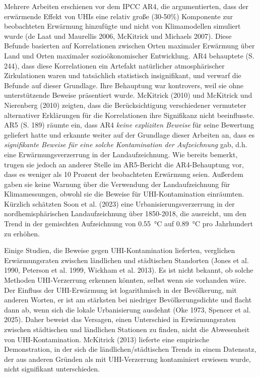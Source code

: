 \documentclass[12pt,paper=a4,DIV=12,parskip=never,chapterprefix=false,headings=standardclasses]{scrreprt}
\begin{document}
Mehrere Arbeiten erschienen vor dem IPCC AR4, die argumentierten, dass der erwärmende Effekt von UHIs eine relativ große (30-50\%) Komponente zur beobachteten Erwärmung hinzufügte und nicht von Klimamodellen simuliert wurde (de Laat und Maurellis 2006, McKitrick und Michaels 2007). Diese Befunde basierten auf Korrelationen zwischen Orten maximaler Erwärmung über Land und Orten maximaler sozioökonomischer Entwicklung. AR4 behauptete (S. 244), dass diese Korrelationen ein Artefakt natürlicher atmosphärischer Zirkulationen waren und tatsächlich statistisch insignifikant, und verwarf die Befunde auf dieser Grundlage. Ihre Behauptung war kontrovers, weil sie ohne unterstützende Beweise präsentiert wurde. McKitrick (2010) und McKitrick und Nierenberg (2010) zeigten, dass die Berücksichtigung verschiedener vermuteter alternativer Erklärungen für die Korrelationen ihre Signifikanz nicht beeinflusste. AR5 (S. 189) räumte ein, dass AR4 \emph{keine expliziten Beweise} für seine Bewertung geliefert hatte und erkannte weiter auf der Grundlage dieser Arbeiten an, dass es \emph{signifikante Beweise für eine solche Kontamination der Aufzeichnung} gab, d.h. eine Erwärmungsverzerrung in der Landaufzeichnung. Wie bereits bemerkt, trugen sie jedoch an anderer Stelle im AR5-Bericht die AR4-Behauptung vor, dass es weniger als 10 Prozent der beobachteten Erwärmung seien. Außerdem gaben sie keine Warnung über die Verwendung der Landaufzeichnung für Klimamessungen, obwohl sie die Beweise für UHI-Kontamination einräumten. Kürzlich schätzten Soon et al. (2023) eine Urbanisierungsverzerrung in der nordhemisphärischen Landaufzeichnung über 1850-2018, die ausreicht, um den Trend in der gemischten Aufzeichnung von \SI{0.55}{\celsius} auf \SI{0.89}{\celsius} pro Jahrhundert zu erhöhen.

Einige Studien, die Beweise gegen UHI-Kontamination lieferten, verglichen Erwärmungsraten zwischen ländlichen und städtischen Standorten (Jones et al. 1990, Peterson et al. 1999, Wickham et al. 2013). Es ist nicht bekannt, ob solche Methoden UHI-Verzerrung erkennen könnten, selbst wenn sie vorhanden wäre. Der Einfluss der UHI-Erwärmung ist logarithmisch in der Bevölkerung, mit anderen Worten, er ist am stärksten bei niedriger Bevölkerungsdichte und flacht dann ab, wenn sich die lokale Urbanisierung ausdehnt (Oke 1973, Spencer et al. 2025). Daher beweist das Versagen, einen Unterschied in Erwärmungsraten zwischen städtischen und ländlichen Stationen zu finden, nicht die Abwesenheit von UHI-Kontamination. McKitrick (2013) lieferte eine empirische Demonstration, in der sich die ländlichen/städtischen Trends in einem Datensatz, der aus anderen Gründen als mit UHI-Verzerrung kontaminiert erwiesen wurde, nicht signifikant unterschieden.
\end{document}
